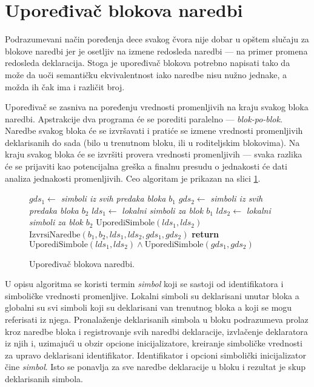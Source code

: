 \section{Upoređivač blokova naredbi}
\label{sec:ASTComparingBlocks}

Podrazumevani način poređenja dece svakog čvora nije dobar u opštem slučaju za blokove naredbi jer je osetljiv na izmene redosleda naredbi --- na primer promena redosleda deklaracija. Stoga je upoređivač blokova potrebno napisati tako da može da uoči semantičku ekvivalentnost iako naredbe nisu nužno jednake, a možda ih čak ima i različit broj.

Upoređivač se zasniva na poređenju vrednosti promenljivih na kraju svakog bloka naredbi. Apstrakcije dva programa će se porediti paralelno --- \emph{blok-po-blok}. Naredbe svakog bloka će se izvršavati i pratiće se izmene vrednosti promenljivih deklarisanih do sada (bilo u trenutnom bloku, ili u roditeljskim blokovima). Na kraju svakog bloka će se izvršiti provera vrednosti promenljivih --- svaka razlika će se prijaviti kao potencijalna greška a finalnu presudu o jednakosti će dati analiza jednakosti promenljivih. Ceo algoritam je prikazan na slici \ref{fig:ComparisonAlgorithmBlocksPseudo}.

\begin{figure}[!h]
\begin{algorithmic}[1]
\State $gds_1 \gets $ \emph{simboli iz svih predaka bloka $b_1$}
\State $gds_2 \gets $ \emph{simboli iz svih predaka bloka $b_2$}
\State $lds_1 \gets $ \emph{lokalni simboli za blok $b_1$}
\State $lds_2 \gets $ \emph{lokalni simboli za blok $b_2$}
\State $\text{UporediSimbole}(lds_1, lds_2)$
\State $\text{IzvrsiNaredbe}(b_1, b_2, lds_1, lds_2, gds_1, gds_2)$
\State \textbf{return} $\text{UporediSimbole}(lds_1, lds_2) \wedge \text{UporediSimbole}(gds_1, gds_2)$
\EndProcedure
\end{algorithmic}
\caption{Upoređivač blokova naredbi.}
\label{fig:ComparisonAlgorithmBlocksPseudo}
\end{figure}

U opisu algoritma se koristi termin \emph{simbol} koji se sastoji od identifikatora i simboličke vrednosti promenljive. Lokalni simboli su deklarisani unutar bloka a globalni su svi simboli koji su deklarisani van trenutnog bloka a koji se mogu referisati iz njega. Pronalaženje deklarisanih simbola u bloku podrazumeva prolaz kroz naredbe bloka i registrovanje svih naredbi deklaracije, izvlačenje deklaratora iz njih i, uzimajući u obzir opcione inicijalizatore, kreiranje simboličke vrednosti za upravo deklarisani identifikator. Identifikator i opcioni simbolički inicijalizator čine \emph{simbol}. Isto se ponavlja za sve naredbe deklaracije u bloku i rezultat je skup deklarisanih simbola.

